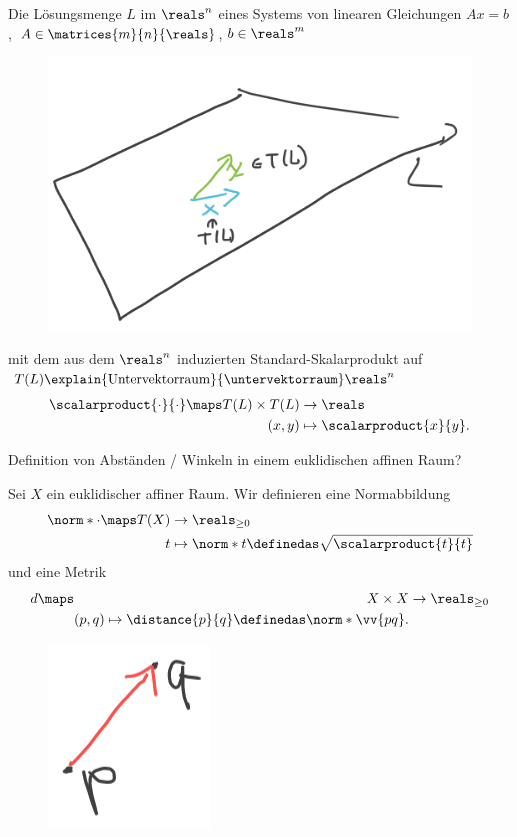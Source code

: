 \begin{beispiel}
  Die Lösungsmenge \( L \) im \( \reals^n \) eines Systems von linearen Gleichungen \( Ax=b \), \( A\in \matrices{m }{n}{\reals} \), \( b\in \reals^m \)
  \begin{figure}[H]
    \centering
    \includegraphics[width=0.5\linewidth]{figures/hyperebene_beispiel_euklidischer_affiner_raum}
    \label{fig:hyperebene_beispiel_euklidischer_affiner_raum}
  \end{figure}
  mit dem aus dem \( \reals^n \) induzierten Standard-Skalarprodukt auf \( T(L)\explain{\text{Untervektorraum}}{\untervektorraum}\reals^n \)
  \begin{equation*}
    \scalarproduct{\cdot}{\cdot}\maps \begin{aligned}[t]
      T(L)\times T(L)&\to \reals\\
      (x,y) &\mapsto \scalarproduct{x}{y}.
    \end{aligned}
  \end{equation*}
\end{beispiel}
\begin{frage*}
  Definition von Abständen / Winkeln in einem euklidischen affinen Raum?
\end{frage*}
\begin{definition}
  Sei \( X \) ein euklidischer affiner Raum. Wir definieren eine Normabbildung
  \begin{equation*}
    \norm*{\cdot}\maps \begin{aligned}[t]
      T(X)&\to \reals_{\geq 0}\\
      t&\mapsto \norm*{t}\definedas \sqrt{\scalarproduct{t}{t}}
    \end{aligned}
  \end{equation*}
  und eine Metrik
  \begin{equation*}
    d\maps \begin{aligned}[t]
      X\times X&\to \reals_{\geq 0}\\
      (p,q)\mapsto \distance{p}{q}\definedas \norm*{\vv{pq}}.
    \end{aligned}
  \end{equation*}
  \begin{figure}[H]
    \centering
    \includegraphics[width=0.2\linewidth]{figures/metrik_auf_affinem_raum_visualisierung}
    \label{fig:metrik_auf_affinem_raum_visualisierung}
  \end{figure}
\end{definition}
